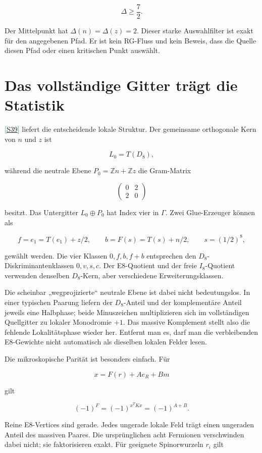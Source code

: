 \documentclass[11pt,a4paper,oneside,parskip=half,headings=normal,numbers=noenddot,bibliography=totoc]{scrreprt}
\newcommand{\src}[1]{\textcolor{teal}{\small[\hyperref[s:#1]{S#1}]}}
\begin{document}
\[
\Delta\geq \frac72.
\]

Der Mittelpunkt hat \(\Delta(n)=\Delta(z)=2\). Dieser starke Auswahlfilter ist exakt für den angegebenen Pfad. Er ist kein RG-Fluss und kein Beweis, dass die Quelle diesen Pfad oder einen kritischen Punkt auswählt.

\section{Das vollständige Gitter trägt die Statistik}

\src{39} liefert die entscheidende lokale Struktur. Der gemeinsame orthogonale Kern von \(n\) und \(z\) ist

\[
L_0=T(D_8),
\]

während die neutrale Ebene \(P_0=\mathbb Zn+\mathbb Zz\) die Gram-Matrix

\[
\begin{pmatrix}0&2\\2&0\end{pmatrix}
\]

besitzt. Das Untergitter \(L_0\oplus P_0\) hat Index vier in \(\Gamma\). Zwei Glue-Erzeuger können als

\[
f=e_1=T(e_1)+z/2,\qquad
b=F(s)=T(s)+n/2,\qquad s=(1/2)^8,
\]

gewählt werden. Die vier Klassen \(0,f,b,f+b\) entsprechen den \(D_8\)-Diskriminantenklassen \(0,v,s,c\). Der E8-Quotient und der freie \(I_8\)-Quotient verwenden denselben \(D_8\)-Kern, aber verschiedene Erweiterungsklassen.

Die scheinbar „wegprojizierte“ neutrale Ebene ist dabei nicht bedeutungslos. In einer typischen Paarung liefern der \(D_8\)-Anteil und der komplementäre Anteil jeweils eine Halbphase; beide Minuszeichen multiplizieren sich im vollständigen Quellgitter zu lokaler Monodromie \(+1\). Das massive Komplement stellt also die fehlende Lokalitätsphase wieder her. Entfernt man es, darf man die verbleibenden E8-Gewichte nicht automatisch als dieselben lokalen Felder lesen.

Die mikroskopische Parität ist besonders einfach. Für

\[
x=F(r)+Ae_R+Bm
\]

gilt

\[
(-1)^F=(-1)^{x^TKx}=(-1)^{A+B}.
\]

Reine E8-Vertices sind gerade. Jedes ungerade lokale Feld trägt einen ungeraden Anteil des massiven Paares. Die ursprünglichen acht Fermionen verschwinden dabei nicht; sie faktorisieren exakt. Für geeignete Spinorwurzeln \(r_i\) gilt
\end{document}
